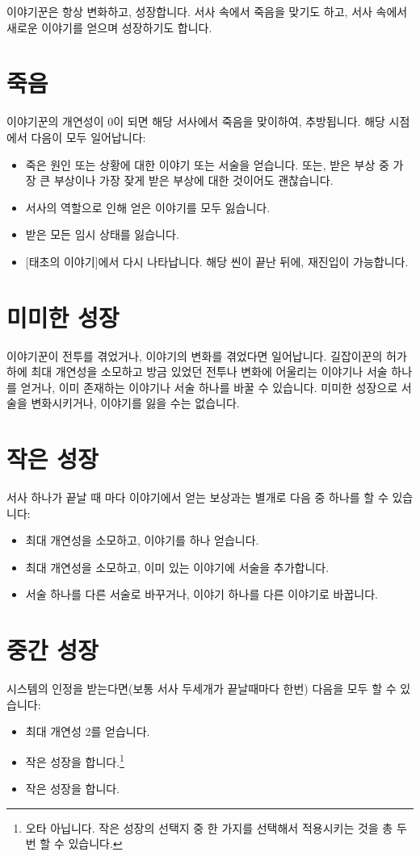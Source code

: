 \documentclass{report}
\begin{document}
	이야기꾼은 항상 변화하고, 성장합니다. 서사 속에서 죽음을 맞기도 하고, 서사 속에서 새로운 이야기를 얻으며 성장하기도 합니다.
	
	\section*{죽음}
	이야기꾼의 개연성이 0이 되면 해당 서사에서 죽음을 맞이하여, 추방됩니다. 해당 시점에서 다음이 모두 일어납니다:
	\begin{itemize}
		\item 죽은 원인 또는 상황에 대한 이야기 또는 서술을 얻습니다. 또는, 받은 부상 중 가장 큰 부상이나 가장 잦게 받은 부상에 대한 것이어도 괜찮습니다.
		\item 서사의 역할으로 인해 얻은 이야기를 모두 잃습니다.
		\item 받은 모든 임시 상태를 잃습니다.
		\item {}[태초의 이야기]에서 다시 나타납니다. 해당 씬이 끝난 뒤에, 재진입이 가능합니다.
	\end{itemize}
	
	\section*{미미한 성장}
	이야기꾼이 전투를 겪었거나, 이야기의 변화를 겪었다면 일어납니다. 길잡이꾼의 허가 하에 최대 개연성을 소모하고 방금 있었던 전투나 변화에 어울리는 이야기나 서술 하나를 얻거나, 이미 존재하는 이야기나 서술 하나를 바꿀 수 있습니다. 미미한 성장으로 서술을 변화시키거나, 이야기를 잃을 수는 없습니다.
	
	\section*{작은 성장}
	서사 하나가 끝날 때 마다 이야기에서 얻는 보상과는 별개로 다음 중 하나를 할 수 있습니다:
	\begin{itemize}
		\item 최대 개연성을 소모하고, 이야기를 하나 얻습니다.
		\item 최대 개연성을 소모하고, 이미 있는 이야기에 서술을 추가합니다.
		\item 서술 하나를 다른 서술로 바꾸거나, 이야기 하나를 다른 이야기로 바꿉니다.
	\end{itemize}
	
	\section*{중간 성장}
	시스템의 인정을 받는다면(보통 서사 두세개가 끝날때마다 한번) 다음을 모두 할 수 있습니다:
	\begin{itemize}
		\item 최대 개연성 2를 얻습니다.
		\item 작은 성장을 합니다.\footnote{\label{lite-medium-upgrade-small-upgrade}오타 아닙니다. 작은 성장의 선택지 중 한 가지를 선택해서 적용시키는 것을 총 두번 할 수 있습니다.}
		\item 작은 성장을 합니다.
	\end{itemize}
	
\end{document}
